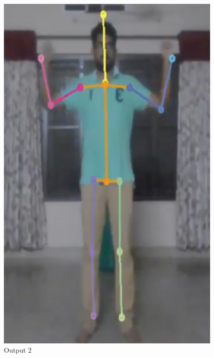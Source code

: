 \documentclass{fisatprojectfinal}
\begin{document}
\begin{figure}[h!]
	\begin{center}
	\includegraphics[scale=0.7]{pose-2}
	\caption{Output 2}
\end{center}
\end{figure}
\end{document}
